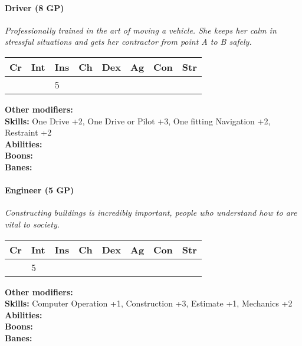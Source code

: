 \paragraph*{Driver (8 GP)}
\textit{Professionally trained in the art of moving a vehicle. She keeps her calm in stressful situations and gets her contractor from point A to B safely.}\par
\begin{tabular}{|l|l|l|l|l|l|l|l|}
	\hline
	Cr & Int & Ins & Ch & Dex & Ag & Con & Str \\ \hline
	&  & 5 &  &  &  &  &  \\ \hline
\end{tabular}\par
\noindent\textbf{Other modifiers:} \\
\textbf{Skills:} One Drive +2,
One Drive or Pilot +3,
One fitting Navigation +2,
Restraint +2\\
\textbf{Abilities:} \\
\textbf{Boons:} \\
\textbf{Banes:} \\

\hrulefill
\paragraph*{Engineer (5 GP)}
\textit{Constructing buildings is incredibly important, people who understand how to are vital to society.}\par
\begin{tabular}{|l|l|l|l|l|l|l|l|}
	\hline
	Cr & Int & Ins & Ch & Dex & Ag & Con & Str \\ \hline
	& 5 &  &  &  &  &  &  \\ \hline
\end{tabular}\par
\noindent\textbf{Other modifiers:} \\
\textbf{Skills:} Computer Operation +1,
Construction +3,
Estimate +1,
Mechanics +2\\
\textbf{Abilities:} \\
\textbf{Boons:} \\
\textbf{Banes:} \\

\hrulefill
